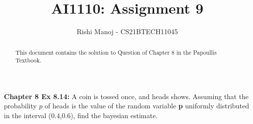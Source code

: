 \documentclass[journal,12pt,twocolumn]{IEEEtran}
\begin{document}
	
	
	\providecommand{\mbf}{\mathbf}
	\providecommand{\pr}[1]{\ensuremath{\Pr\left(#1\right)}}
	\providecommand{\qfunc}[1]{\ensuremath{Q\left(#1\right)}}
	\providecommand{\sbrak}[1]{\ensuremath{{}\left[#1\right]}}
	\providecommand{\lsbrak}[1]{\ensuremath{{}\left[#1\right.}}
	\providecommand{\rsbrak}[1]{\ensuremath{{}\left.#1\right]}}
	\providecommand{\brak}[1]{\ensuremath{\left(#1\right)}}
	\providecommand{\lbrak}[1]{\ensuremath{\left(#1\right.}}
	\providecommand{\rbrak}[1]{\ensuremath{\left.#1\right)}}
	\providecommand{\cbrak}[1]{\ensuremath{\left\{#1\right\}}}
	\providecommand{\lcbrak}[1]{\ensuremath{\left\{#1\right.}}
	\providecommand{\rcbrak}[1]{\ensuremath{\left.#1\right\}}}
	\providecommand{\dec}[2]{\ensuremath{\overset{#1}{\underset{#2}{\gtrless}}}}
	\newcommand{\myvec}[1]{\ensuremath{\begin{pmatrix}#1\end{pmatrix}}}
	\newcommand{\mydet}[1]{\ensuremath{\begin{vmatrix}#1\end{vmatrix}}}
	\newcommand*{\permcomb}[4][0mu]{{{}^{#3}\mkern#1#2_{#4}}}
	\newcommand*{\perm}[1][-3mu]{\permcomb[#1]{P}}
	\newcommand*{\comb}[1][-1mu]{\permcomb[#1]{C}}
		\title{
				AI1110: Assignment 9
		}
		\author{
			Rishi Manoj - CS21BTECH11045
		}
			
	\maketitle
	\begin{abstract}
		This document contains the solution to Question of Chapter 8 in the Papoullis Textbook.
	\end{abstract}
	
	\textbf{Chapter 8 Ex 8.14:}
	A coin is tossed once, and heads shows. Assuming that the probability $p$ of heads is the value of the random variable \textbf{p} uniformly distributed in the interval (0.4,0.6), find the bayesian estimate.
	
\end{document}
